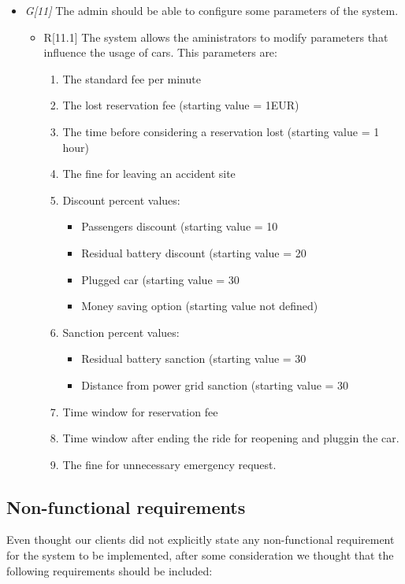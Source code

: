 \begin{itemize}
				\item \textit{G[11]} The admin should be able to configure some parameters of the system.
					\begin{itemize}
						\item R[11.1] The system allows the aministrators to modify parameters that influence the usage of cars. This parameters are:
							\begin{enumerate}
								\item The standard fee per minute
								\item The lost reservation fee (starting value = 1EUR)
								\item The time before considering a reservation lost (starting value = 1 hour)
								\item The fine for leaving an accident site
								\item Discount percent   values:
									\begin{itemize}
										\item Passengers discount (starting value = 10%
										\item Residual battery discount (starting value = 20%
										\item Plugged car (starting value = 30%
										\item Money saving option (starting value not defined)
									\end{itemize}
								\item Sanction percent values:
									\begin{itemize}
										\item Residual battery sanction (starting value = 30%
										\item Distance from power grid sanction (starting value = 30%
									\end{itemize}
								\item Time window for reservation fee
								\item Time window after ending the ride for reopening and pluggin the car.
								\item The fine for unnecessary emergency request.
							\end{enumerate}
					\end{itemize}
\end{itemize}





\subsection{Non-functional requirements}
	Even thought our clients did not explicitly state any non-functional requirement for the system to be implemented, after some consideration we thought that the following requirements should be included:
	
